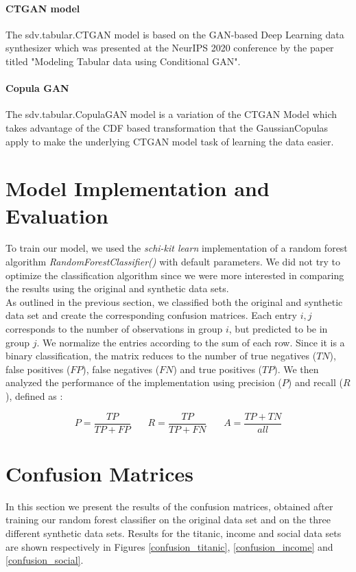 \documentclass{article}
\begin{document}
\paragraph{CTGAN model}
The sdv.tabular.CTGAN model \cite{ctgan} is based on the GAN-based Deep Learning data synthesizer which was presented at the NeurIPS 2020 conference by the paper titled "Modeling Tabular data using Conditional GAN".
\paragraph{Copula GAN}
The sdv.tabular.CopulaGAN model \cite{copulagan} is a variation of the CTGAN Model which takes advantage of the CDF based transformation that the GaussianCopulas apply to make the underlying CTGAN model task of learning the data easier.



\section{Model Implementation and Evaluation}

To train our model, we used the \textit{schi-kit learn} implementation of a random forest algorithm \textit{RandomForestClassifier()} with default parameters. We did not try to optimize the classification algorithm since we were more interested in comparing the results using the original and synthetic data sets.
\\

As outlined in the previous section, we classified both the original and synthetic data set and create the corresponding confusion matrices. Each entry $i,j$ corresponds to the number of observations in group $i$, but predicted to be in group $j$. We normalize the entries according to the sum of each row. Since it is a binary classification, the matrix reduces to the number of true negatives ($TN$), false positives ($FP$), false negatives ($FN$) and true positives ($TP$). We then analyzed the performance of the implementation using   precision ($P$) and recall ($R$), defined as :

\begin{equation}
P = \frac{TP}{TP + FP} \ \ \ \ \ \ \ \  R = \frac{TP}{TP + FN} \ \ \ \ \ \ \ \  A = \frac{TP + TN}{all}
\end{equation}


\section{Confusion Matrices}
In this section we present the results of the confusion matrices, obtained after training our random forest classifier on the original data set and on the three different synthetic data sets. Results for the titanic, income and social data sets are shown respectively in Figures \ref{confusion_titanic}, \ref{confusion_income} and \ref{confusion_social}. 
\end{document}
